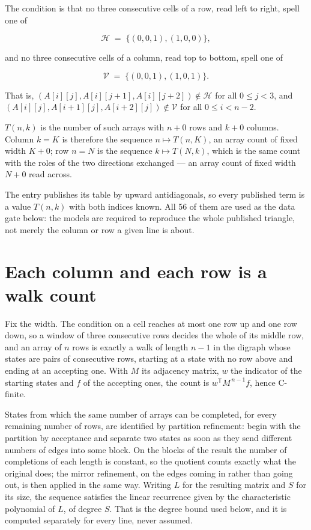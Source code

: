 \documentclass[11pt]{article}
\theoremstyle{definition}
\begin{document}
The condition is that no three consecutive cells of a row, read left to right, spell one of

\[\mathcal{H} \;=\; \{(0,0,1), (1,0,0)\},\]

and no three consecutive cells of a column, read top to bottom, spell one of

\[\mathcal{V} \;=\; \{(0,0,1), (1,0,1)\}.\]

That is, $(A[i][j],A[i][j{+}1],A[i][j{+}2]) \notin \mathcal{H}$ for all $0 \le j < 3$, and $(A[i][j],A[i{+}1][j],A[i{+}2][j]) \notin \mathcal{V}$ for all $0 \le i < n-2$.

$T(n,k)$ is the number of such arrays with $n + 0$ rows and $k + 0$ columns. Column $k = K$ is therefore the sequence $n \mapsto T(n,K)$, an array count of fixed width $K + 0$; row $n = N$ is the sequence $k \mapsto T(N,k)$, which is the same count with the roles of the two directions exchanged --- an array count of fixed width $N + 0$ read across.

The entry publishes its table by upward antidiagonals, so every published term is a value $T(n,k)$ with both indices known. All 56 of them are used as the data gate below: the models are required to reproduce the whole published triangle, not merely the column or row a given line is about.

\section{Each column and each row is a walk count}

Fix the width. The condition on a cell reaches at most one row up and one row down, so a window of three consecutive rows decides the whole of its middle row, and an array of $n$ rows is exactly a walk of length $n-1$ in the digraph whose states are pairs of consecutive rows, starting at a state with no row above and ending at an accepting one. With $M$ its adjacency matrix, $w$ the indicator of the starting states and $f$ of the accepting ones, the count is $w^{\mathsf T}M^{\,n-1}f$, hence C-finite.

States from which the same number of arrays can be completed, for every remaining number of rows, are identified by partition refinement: begin with the partition by acceptance and separate two states as soon as they send different numbers of edges into some block. On the blocks of the result the number of completions of each length is constant, so the quotient counts exactly what the original does; the mirror refinement, on the edges coming in rather than going out, is then applied in the same way. Writing $L$ for the resulting matrix and $S$ for its size, the sequence satisfies the linear recurrence given by the characteristic polynomial of $L$, of degree $S$. That is the degree bound used below, and it is computed separately for every line, never assumed.
\end{document}
